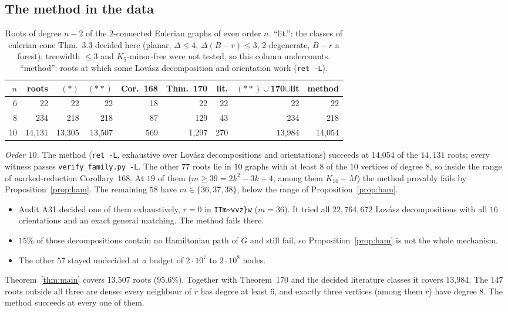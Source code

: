 \documentclass[11pt]{amsart}
\theoremstyle{definition}
\begin{document}
\subsection{The method in the data}
\begin{table}[h]
\small
\begin{tabular}{@{}rrrrrrrrr@{}}
\toprule
$n$ & roots & $(\ast)$ & $(\ast\ast)$ & Cor.~168 & Thm.~170 & lit. & $(\ast\ast)\cup$170$\cup$lit & method\\
\midrule
6 & 22 & 22 & 22 & 18 & 22 & 22 & 22 & 22\\
8 & 234 & 218 & 218 & 87 & 129 & 43 & 234 & 218\\
10 & 14{,}131 & 13{,}305 & 13{,}507 & 569 & 1{,}297 & 270 & 13{,}984 & 14{,}054\\
\bottomrule
\end{tabular}
\caption{Roots of degree $n-2$ of the $2$-connected Eulerian graphs of even order $n$. ``lit.'': the
classes of eulerian-cone Thm.~3.3 decided here (planar, $\Delta\le4$, $\Delta(B-r)\le3$,
$2$-degenerate, $B-r$ a forest); treewidth $\le3$ and $K_5$-minor-free were not tested, so this
column undercounts. ``method'': roots at which some Lov\'asz decomposition and orientation work
(\texttt{ret -L}).}\label{tab:cov}
\end{table}

\emph{Order $10$.} The method (\texttt{ret -L}, exhaustive over Lov\'asz decompositions and
orientations) succeeds at 14{,}054 of the $14{,}131$ roots; every witness passes
\texttt{verify\_family.py -L}. The other $77$ roots lie in $10$ graphs with at least $8$ of the $10$
vertices of degree $8$, so inside the range of marked-reduction Corollary~168. At $19$ of them
($m\ge39=2k^2-3k+4$, among them $K_{10}-M$) the method provably fails by Proposition~\ref{prop:ham}.
The remaining $58$ have $m\in\{36,37,38\}$, below the range of Proposition~\ref{prop:ham}.
\begin{itemize}[leftmargin=*]
\item Audit A31 decided one of them exhaustively, $r=0$ in \texttt{ITm\textasciitilde vvz\}w} ($m=36$). It
tried all $22{,}764{,}672$ Lov\'asz decompositions with all $16$ orientations and an exact general
matching. The method fails there.
\item $15\%$ of those decompositions contain no Hamiltonian path of $G$ and still fail, so
Proposition~\ref{prop:ham} is not the whole mechanism.
\item The other $57$ stayed undecided at a budget of $2\cdot10^7$ to $2\cdot10^8$ nodes.
\end{itemize} Theorem~\ref{thm:main} covers 13{,}507 roots
($95.6\%$). Together with Theorem~170 and the decided literature classes it covers 13{,}984. The
$147$ roots outside all three are dense: every neighbour of $r$ has degree at least $6$, and exactly
three vertices (among them $r$) have degree $8$. The method succeeds at every one of them.
\end{document}
